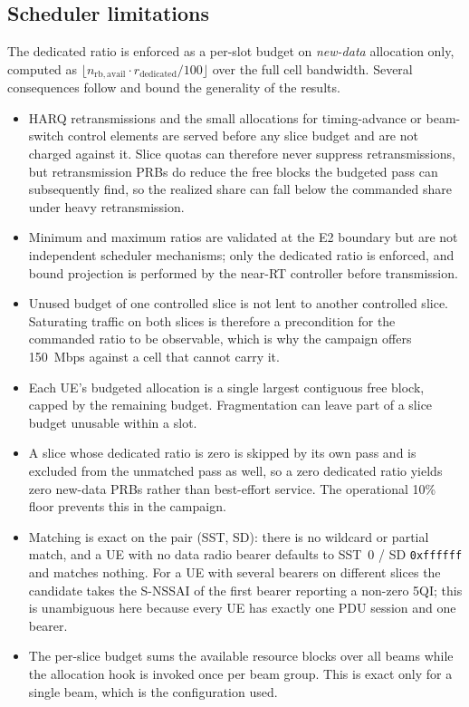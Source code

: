 \subsection{Scheduler limitations}
The dedicated ratio is enforced as a per-slot budget on \emph{new-data} allocation only, computed as $\lfloor n_{\mathrm{rb,avail}}\cdot r_{\mathrm{dedicated}}/100\rfloor$ over the full cell bandwidth. Several consequences follow and bound the generality of the results.
\begin{itemize}
  \item HARQ retransmissions and the small allocations for timing-advance or beam-switch control elements are served before any slice budget and are not charged against it. Slice quotas can therefore never suppress retransmissions, but retransmission PRBs do reduce the free blocks the budgeted pass can subsequently find, so the realized share can fall below the commanded share under heavy retransmission.
  \item Minimum and maximum ratios are validated at the E2 boundary but are not independent scheduler mechanisms; only the dedicated ratio is enforced, and bound projection is performed by the near-RT controller before transmission.
  \item Unused budget of one controlled slice is not lent to another controlled slice. Saturating traffic on both slices is therefore a precondition for the commanded ratio to be observable, which is why the campaign offers 150~Mbps against a cell that cannot carry it.
  \item Each UE's budgeted allocation is a single largest contiguous free block, capped by the remaining budget. Fragmentation can leave part of a slice budget unusable within a slot.
  \item A slice whose dedicated ratio is zero is skipped by its own pass and is excluded from the unmatched pass as well, so a zero dedicated ratio yields zero new-data PRBs rather than best-effort service. The operational 10\% floor prevents this in the campaign.
  \item Matching is exact on the pair (SST, SD): there is no wildcard or partial match, and a UE with no data radio bearer defaults to SST~0 / SD \texttt{0xffffff} and matches nothing. For a UE with several bearers on different slices the candidate takes the S-NSSAI of the first bearer reporting a non-zero 5QI; this is unambiguous here because every UE has exactly one PDU session and one bearer.
  \item The per-slice budget sums the available resource blocks over all beams while the allocation hook is invoked once per beam group. This is exact only for a single beam, which is the configuration used.

\end{itemize}
